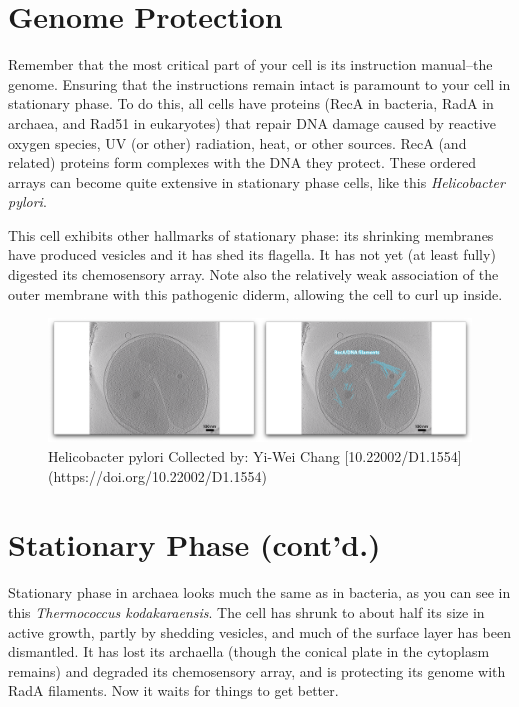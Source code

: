 \documentclass[]{tufte-book}
\begin{document}
\section{Genome Protection}\label{genome-protection}

Remember that the most critical part of your cell is its instruction
manual--the genome. Ensuring that the instructions remain intact is
paramount to your cell in stationary phase. To do this, all cells have
proteins (RecA in bacteria, RadA in archaea, and Rad51 in eukaryotes)
that repair DNA damage caused by reactive oxygen species, UV (or other)
radiation, heat, or other sources. RecA (and related) proteins form
complexes with the DNA they protect. These ordered arrays can become
quite extensive in stationary phase cells, like this \emph{Helicobacter
pylori}.

This cell exhibits other hallmarks of stationary phase: its shrinking
membranes have produced vesicles and it has shed its flagella. It has
not yet (at least fully) digested its chemosensory array. Note also the
relatively weak association of the outer membrane with this pathogenic
diderm, allowing the cell to curl up inside.

\begin{figure}
\includegraphics{movie_stills/8_2} \caption[Helicobacter pylori Collected by]{Helicobacter pylori Collected by: Yi-Wei Chang [10.22002/D1.1554](https://doi.org/10.22002/D1.1554)}\label{fig:unnamed-chunk-134}
\end{figure}

\section{Stationary Phase (cont'd.)}\label{stationary-phase-contd.}

Stationary phase in archaea looks much the same as in bacteria, as you
can see in this \emph{Thermococcus kodakaraensis}. The cell has shrunk
to about half its size in active growth, partly by shedding vesicles,
and much of the surface layer has been dismantled. It has lost its
archaella (though the conical plate in the cytoplasm remains) and
degraded its chemosensory array, and is protecting its genome with RadA
filaments. Now it waits for things to get better.
\end{document}
